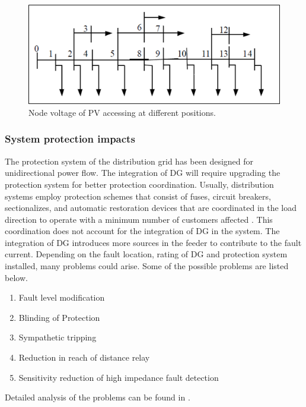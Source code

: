 \begin{figure}[!h]
\centering
\includegraphics[width=0.85\linewidth]{figs/VR1.png}
\caption[Node voltage of PV accessing at different positions]{Node voltage of PV accessing at different positions.\cite{VR1}}
\label{fig:VR2}
\end{figure}

\subsubsection{System protection impacts}
The protection system of the distribution grid has been designed for unidirectional power flow. The integration of DG will require upgrading the protection system for better protection coordination. Usually, distribution systems employ protection schemes that consist of fuses, circuit breakers, sectionalizes, and automatic restoration devices that are coordinated in the load direction to operate with a minimum number of customers affected \cite{PRO1}. This coordination does not account for the integration of DG in the system. The integration of DG introduces more sources in the feeder to contribute to the fault current. Depending on the fault location, rating of DG and protection system installed, many problems could arise. Some of the possible problems are listed below.
\begin{enumerate}
    \item Fault level modification
    \item Blinding of Protection
    \item Sympathetic tripping
    \item Reduction in reach of distance relay
    \item Sensitivity reduction of high impedance fault detection
\end{enumerate}
Detailed analysis of the problems can be found in \cite{PRO2}.

